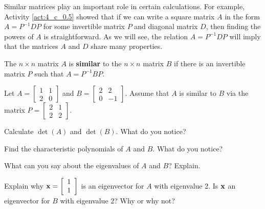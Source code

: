 Similar matrices play an important role in certain calculations. For example, Activity  \ref{act:4_c_0.5} showed that if we can write a square matrix $A$ in the form $A = P^{-1}DP$ for some invertible matrix $P$ and diagonal matrix $D$, then finding the powers of $A$ is straightforward. As we will see, the relation $A = P^{-1}DP$ will imply that the matrices $A$ and $D$ share many properties. 



\begin{definition} The $n \times n$ matrix $A$ is \textbf{similar} to the $n \times n$ matrix $B$ if there is an invertible matrix $P$ such that $A = P^{-1}BP$.
\end{definition}



\begin{activity} \label{act:4_c_1} Let $A = \left[ \begin{array}{cc} 1&1\\2&0 \end{array} \right]$ and $B = \left[ \begin{array}{cr} 2&2\\0&-1 \end{array} \right]$. Assume that $A$ is similar to $B$ via the matrix $P = \left[ \begin{array}{cc} 2&1\\2&2 \end{array} \right]$.
    \ba
    \item Calculate $\det(A)$ and $\det(B)$. What do you notice?



    \item Find the characteristic polynomials of $A$ and $B$. What do you notice?



    \item What can you say about the eigenvalues of $A$ and $B$? Explain.



    \item Explain why $\mathbf{x} = \left[ \begin{array}{c} 1\\1 \end{array} \right]$ is an eigenvector for $A$ with eigenvalue 2. Is $\mathbf{x}$ an eigenvector for $B$ with eigenvalue 2? Why or why not?



    \ea

\end{activity}



